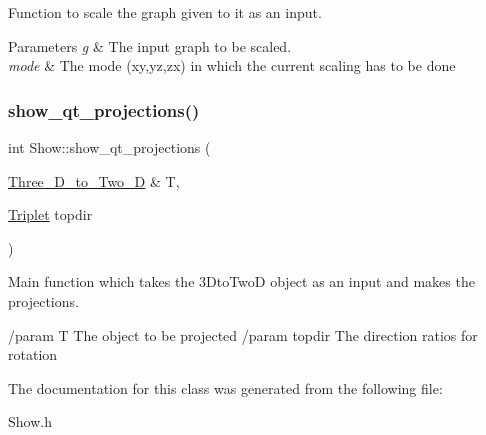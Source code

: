 Function to scale the graph given to it as an input. 


\begin{DoxyParams}{Parameters}
{\em g} & The input graph to be scaled. \\
\hline
{\em mode} & The mode (xy,yz,zx) in which the current scaling has to be done \\
\hline
\end{DoxyParams}
\mbox{\label{class_show_a674f8dc51bcf6c3d5808f5eb411dbf36}} 
\subsubsection{\texorpdfstring{show\+\_\+qt\+\_\+projections()}{show\_qt\_projections()}}
{\footnotesize\ttfamily int Show\+::show\+\_\+qt\+\_\+projections (\begin{DoxyParamCaption}\item[{\mbox{\hyperlink{class_three___d__to___two___d}{Three\+\_\+\+D\+\_\+to\+\_\+\+Two\+\_\+D}} \&}]{T,  }\item[{\mbox{\hyperlink{struct_triplet}{Triplet}}}]{topdir }\end{DoxyParamCaption})}



Main function which takes the 3\+Dto\+TwoD object as an input and makes the projections. 

/param T The object to be projected /param topdir The direction ratios for rotation 

The documentation for this class was generated from the following file\+:\begin{DoxyCompactItemize}
\item 
Show.\+h\end{DoxyCompactItemize}
